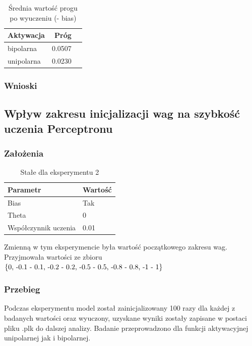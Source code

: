 \documentclass{article}
\begin{document}
\begin{table}[h]
	\caption{Średnia wartość progu po wyuczeniu (- bias) }
	\label{tabela-res-12}
	\centering
	\begin{tabular}{lrr}
		\toprule
		Aktywacja  & Próg  \\
		\midrule
		bipolarna  & 0.0507 \\
		unipolarna & 0.0230 \\
		\bottomrule
	\end{tabular}
\end{table}

\subsubsection*{Wnioski}


\newpage
\subsection{Wpływ zakresu inicjalizacji wag na szybkość uczenia Perceptronu}
\subsubsection*{Założenia}
\begin{table}[h]
	\caption{Stałe dla eksperymentu 2}
	\label{tabela-const-2}
	\centering
	\begin{tabular}{ll}
		\toprule
		Parametr               & Wartość \\
		\midrule
		Bias                   & Tak       \\
		Theta                  & 0         \\
		Współczynnik uczenia & 0.01      \\
		\bottomrule
	\end{tabular}
\end{table}

Zmienną w tym eksperymencie była wartość początkowego zakresu wag. Przyjmowała wartości ze zbioru \(\{$0, -0.1 - 0.1, -0.2 - 0.2, -0.5 - 0.5, -0.8 - 0.8, -1 - 1$\}\)
\subsubsection*{Przebieg}

Podczas eksperymentu model został zainicjalizowany 100 razy dla każdej z badanych wartości oraz wyuczony, uzyskane wyniki zostały zapisane w postaci pliku .plk do dalszej analizy. Badanie przeprowadzono dla funkcji aktywacyjnej unipolarnej jak i bipolarnej.
\end{document}
